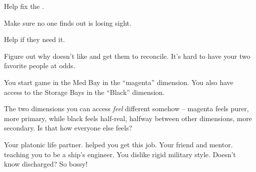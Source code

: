 \documentclass[char]{TMFHope}
\begin{document}
\begin{itemz}[Goals]
	\item Help \cEng{} fix the \pNew{}.
	\item Make sure no one finds out \cEng{} is losing \cEng{\their} sight.
	\item Help \cNav{} if they need it.
	\item Figure out why \cEng{} doesn't like \cNav{} and get them to reconcile. It's hard to have your two favorite people at odds.
\end{itemz}

\begin{itemz}[Notes]
	\item You start game in the Med Bay in the ``magenta'' dimension. You also have access to the Storage Bays in the ``Black'' dimension.
	\item The two dimensions you can access {\em feel} different somehow -- magenta feels purer, more primary, while black feels half-real, halfway between other dimensions, more secondary.  Is that how everyone else feels?
\end{itemz}

\begin{contacts}
	\contact{\cNav{}} Your platonic life partner. \cNav{\They} helped you get this job.
	\contact{\cEng{}} Your friend and mentor. \cEng{\They} \cEng{\are} teaching you to be a ship's engineer.
	\contact{\cCap{}} You dislike \cCap{\their} rigid military style. Doesn't \cCap{} know \cCap{\they} \cCap{\were} discharged? So bossy!
\end{contacts}
\end{document}
